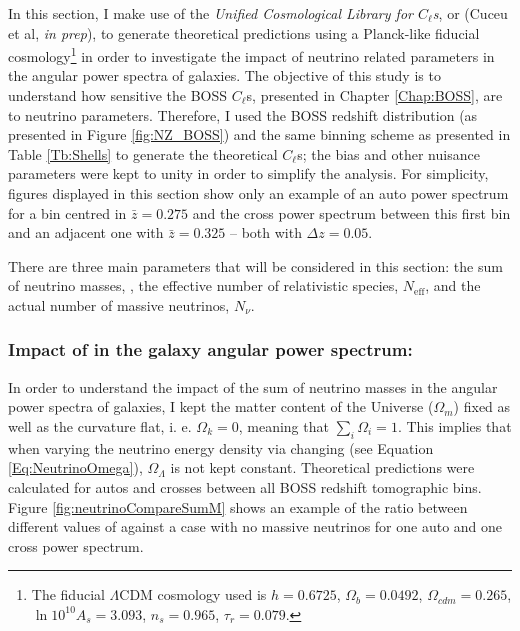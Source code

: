 \qquad In this section, I make use of the \textit{Unified Cosmological Library for $C_{\ell}$s}, or \uclcl (Cuceu et al, \textit{in prep}), to generate theoretical predictions using a Planck-like fiducial cosmology\footnote{The fiducial $\Lambda$CDM cosmology used is $h=0.6725$, $\Omega_b = 0.0492$, $\Omega_{cdm} = 0.265$, $\ln 10^{10}A_s = 3.093$, $n_s = 0.965$, $\tau_r = 0.079$.} in order to investigate the impact of neutrino related parameters in the angular power spectra of galaxies. The objective of this study is to understand how sensitive the BOSS $C_{\ell}$s, presented in Chapter \ref{Chap:BOSS}, are to neutrino parameters. Therefore, I used the BOSS redshift distribution (as presented in Figure \ref{fig:NZ_BOSS}) and the same binning scheme as presented in Table \ref{Tb:Shells} to generate the theoretical $C_{\ell}$s; the bias and other nuisance parameters were kept to unity in order to simplify the analysis. For simplicity, figures displayed in this section show only an example of an auto power spectrum for a bin centred in $\bar{z} = 0.275$ and the cross power spectrum between this first bin and an adjacent one with $\bar{z} = 0.325$ -- both with $\Delta z = 0.05$.

\qquad There are three main parameters that will be considered in this section: the sum of neutrino masses, \NM{}, the effective number of relativistic species, $N_{\text{eff}}$, and the actual number of massive neutrinos, $N_{\nu}$.

\subsubsection{Impact of \NM{} in the galaxy angular power spectrum:}
In order to understand the impact of the sum of neutrino masses in the angular power spectra of galaxies, I kept the matter content of the Universe ($\Omega_m$) fixed as well as the curvature flat, i. e. $\Omega_{k} = 0$, meaning that $\sum_i \Omega_i = 1$. This implies that when varying the neutrino energy density via changing \NM{} (see Equation \ref{Eq:NeutrinoOmega}), $\Omega_{\Lambda}$ is not kept constant. Theoretical predictions were calculated for autos and crosses between all BOSS redshift tomographic bins. Figure \ref{fig:neutrinoCompareSumM} shows an example of the ratio between different values of \NM{} against a case with no massive neutrinos for one auto and one cross power spectrum.


